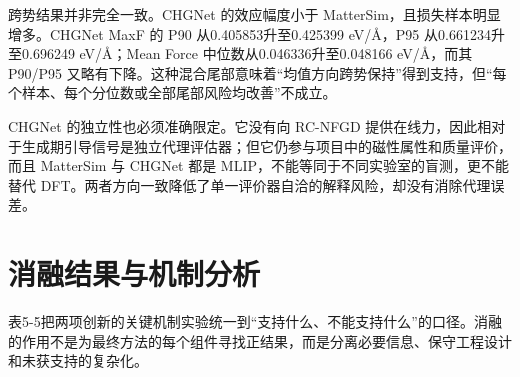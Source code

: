跨势结果并非完全一致。CHGNet 的效应幅度小于 Matter\allowbreak Sim，且损失样本明显增多。CHGNet MaxF 的 P90 从0.405853升至0.425399 eV/Å，P95 从0.661234升至0.696249 eV/Å；Mean Force 中位数从0.046336升至0.048166 eV/Å，而其 P90/P95 又略有下降。这种混合尾部意味着``均值方向跨势保持''得到支持，但``每个样本、每个分位数或全部尾部风险均改善''不成立。

CHGNet 的独立性也必须准确限定。它没有向 RC-NFGD 提供在线力，因此相对于生成期引导信号是独立代理评估器；但它仍参与项目中的磁性属性和质量评价，而且 Matter\allowbreak Sim 与 CHGNet 都是 MLIP，不能等同于不同实验室的盲测，更不能替代 DFT。两者方向一致降低了单一评价器自洽的解释风险，却没有消除代理误差。

\section{消融结果与机制分析}

表5-5把两项创新的关键机制实验统一到``支持什么、不能支持什么''的口径。消融的作用不是为最终方法的每个组件寻找正结果，而是分离必要信息、保守工程设计和未获支持的复杂化。

\clearpage

